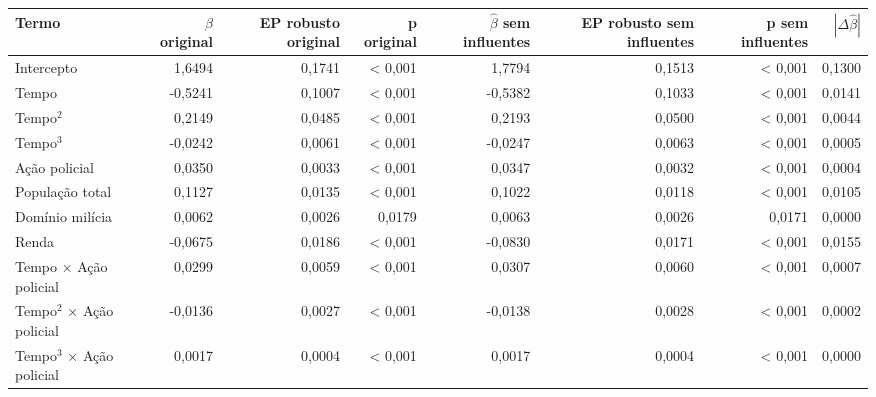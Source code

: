 
\begin{tabular}{lrrrrrrr}
\toprule
Termo & $\hat{\beta}$ original & EP robusto original & p original & $\hat{\beta}$ sem influentes & EP robusto sem influentes & p sem influentes & $|\Delta \hat{\beta}|$\\
\midrule
Intercepto & 1,6494 & 0,1741 & < 0,001 & 1,7794 & 0,1513 & < 0,001 & 0,1300\\
Tempo & -0,5241 & 0,1007 & < 0,001 & -0,5382 & 0,1033 & < 0,001 & 0,0141\\
Tempo$^2$ & 0,2149 & 0,0485 & < 0,001 & 0,2193 & 0,0500 & < 0,001 & 0,0044\\
Tempo$^3$ & -0,0242 & 0,0061 & < 0,001 & -0,0247 & 0,0063 & < 0,001 & 0,0005\\
A\c{c}\~ao policial & 0,0350 & 0,0033 & < 0,001 & 0,0347 & 0,0032 & < 0,001 & 0,0004\\
\addlinespace
Popula\c{c}\~ao total & 0,1127 & 0,0135 & < 0,001 & 0,1022 & 0,0118 & < 0,001 & 0,0105\\
Dom\'inio mil\'icia & 0,0062 & 0,0026 & 0,0179 & 0,0063 & 0,0026 & 0,0171 & 0,0000\\
Renda & -0,0675 & 0,0186 & < 0,001 & -0,0830 & 0,0171 & < 0,001 & 0,0155\\
Tempo $\times$ A\c{c}\~ao policial & 0,0299 & 0,0059 & < 0,001 & 0,0307 & 0,0060 & < 0,001 & 0,0007\\
Tempo$^2$ $\times$ A\c{c}\~ao policial & -0,0136 & 0,0027 & < 0,001 & -0,0138 & 0,0028 & < 0,001 & 0,0002\\
\addlinespace
Tempo$^3$ $\times$ A\c{c}\~ao policial & 0,0017 & 0,0004 & < 0,001 & 0,0017 & 0,0004 & < 0,001 & 0,0000\\
\bottomrule
\end{tabular}
